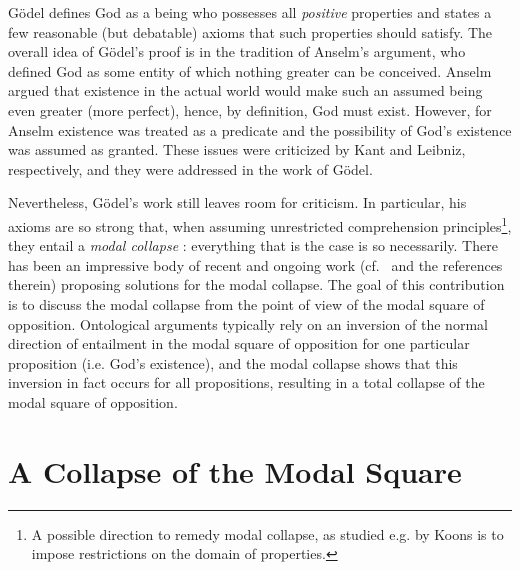 \documentclass{birkmult}
\theoremstyle{definition}
\theoremstyle{remark}
\numberwithin{equation}{section}
\begin{document}
G\"{o}del defines God as a being who possesses all \emph{positive}
properties and states a few reasonable (but debatable) axioms that
such properties should satisfy.  The overall idea of G{\"o}del's proof
is in the tradition of Anselm's argument, who defined God as some
entity of which nothing greater can be conceived.  Anselm argued that
existence in the actual world would make such an assumed being even
greater (more perfect), hence, by definition, God must exist. However,
for Anselm existence was treated as a predicate and the possibility of
God's existence was assumed as granted.  These issues were criticized
by Kant and Leibniz, respectively, and they were addressed in the work
of G\"odel.

Nevertheless, G{\"o}del's work still leaves room for criticism.  In
particular, his axioms are so strong that, when assuming unrestricted
comprehension principles\footnote{A possible direction to remedy modal
  collapse, as studied e.g. by Koons
  \cite{koons06:_sobel_goedel_ontol_proof} is to impose restrictions
  on the domain of properties.}, 
they entail a \emph{modal collapse}
\cite{Sobel1987,sobel2004logic}: everything that is the case is so
necessarily.  There has been an impressive body of recent and ongoing
work
(cf.~\cite{sobel2004logic,Fitting,anderson90:_some_emend_of_goedel_ontol_proof,AndersonGettings,bjordal99,fuhrmann05:_exist_notwen,Hajek2002,Hajek2008,ContemporaryBibliography}
and the references therein) proposing solutions for the modal
collapse.  The goal of this contribution is to discuss the modal
collapse from the point of view of the modal square of opposition. 
Ontological arguments typically rely on an inversion of the normal direction of entailment
in the modal square of opposition for one particular proposition (i.e. God's existence), 
and the modal collapse shows that this inversion in fact occurs for all propositions, resulting in a total collapse of the modal square of opposition.



\section{A Collapse of the Modal Square}
\end{document}
